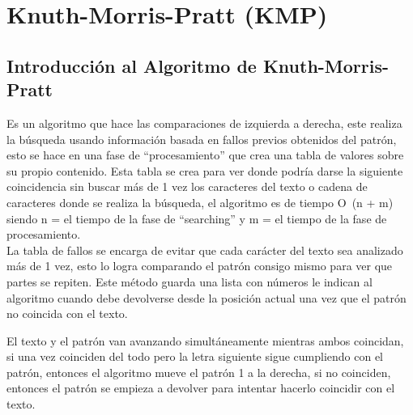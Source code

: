 \section*{Knuth-Morris-Pratt (KMP)}
{}

\subsection*{Introducción al Algoritmo de Knuth-Morris-Pratt}
\quad Es un algoritmo que hace las comparaciones de izquierda a derecha, este realiza la búsqueda usando información basada en fallos previos obtenidos del patrón, esto se hace en una fase de “procesamiento” que crea una tabla de valores sobre su propio contenido. Esta tabla se crea para ver donde podría darse la siguiente coincidencia sin buscar más de 1 vez los caracteres del texto o cadena de caracteres donde se realiza la búsqueda, el algoritmo es de tiempo O~(n + m) siendo n = el tiempo de la fase de “searching” y m = el tiempo de la fase de procesamiento.
\\
\quad La tabla de fallos se encarga de evitar que cada carácter del texto sea analizado más de 1 vez, esto lo logra comparando el patrón consigo mismo para ver que partes se repiten. Este método guarda una lista con números le indican al algoritmo cuando debe devolverse desde la posición actual una vez que el patrón no coincida con el texto.

\quad El texto y el patrón van avanzando simultáneamente mientras ambos coincidan, si una vez coinciden del todo pero la letra siguiente sigue cumpliendo con el patrón, entonces el algoritmo mueve el patrón 1 a la derecha, si no coinciden, entonces el patrón se empieza a devolver para intentar hacerlo coincidir con el texto.

